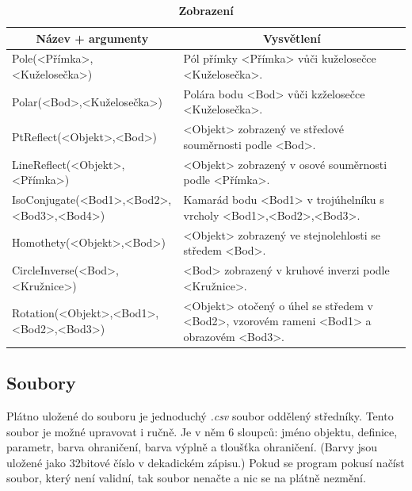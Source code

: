 \documentclass[11pt]{article}
\begin{document}
    \begin{table}[!htb]
    \begin{center}
        \caption{\bf Zobrazení}
        \begin{tabularx}{\linewidth}{|l|X|}
            \hline 
            \multicolumn{1}{|c|}{\textbf{Název + argumenty}} & \multicolumn{1}{c|}{\textbf{Vysvětlení}}\\
            \hline 
            
            Pole(<Přímka>,<Kuželosečka>) & Pól přímky <Přímka> vůči kuželosečce <Kuželosečka>. \\
            \hline
            Polar(<Bod>,<Kuželosečka>) & Polára bodu <Bod> vůči kzželosečce <Kuželosečka>. \\
            \hline
            PtReflect(<Objekt>,<Bod>) & <Objekt> zobrazený ve středové souměrnosti podle <Bod>. \\
            \hline
            LineReflect(<Objekt>,<Přímka>) & <Objekt> zobrazený v osové souměrnosti podle <Přímka>. \\
            \hline
            IsoConjugate(<Bod1>,<Bod2>,<Bod3>,<Bod4>) & Kamarád bodu <Bod1> v trojúhelníku s vrcholy <Bod1>,<Bod2>,<Bod3>. \\
            \hline
            Homothety(<Objekt>,<Bod>) & <Objekt> zobrazený ve stejnolehlosti se středem <Bod>. \\
            \hline
            CircleInverse(<Bod>,<Kružnice>) & <Bod> zobrazený v kruhové inverzi podle <Kružnice>. \\
            \hline
            Rotation(<Objekt>,<Bod1>,<Bod2>,<Bod3>) & <Objekt> otočený o úhel se středem v <Bod2>, vzorovém rameni <Bod1> a obrazovém <Bod3>. \\
            \hline
        \end{tabularx}
    \end{center}
    \end{table}

    \begin{samepage}
        \subsection{Soubory}
        Plátno uložené do souboru je jednoduchý \textit{.csv} soubor oddělený středníky. Tento soubor je možné upravovat i ručně. Je v něm 6 sloupců: jméno objektu, definice, parametr, barva ohraničení, barva výplně a tloušťka ohraničení. (Barvy jsou uložené jako 32bitové číslo v dekadickém zápisu.) Pokud se program pokusí načíst soubor, který není validní, tak soubor nenačte a nic se na plátně nezmění.
        
    \end{samepage}
\end{document}

